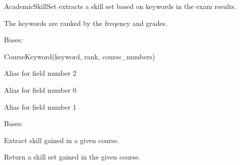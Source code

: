 \documentclass[letterpaper,10pt,english]{sphinxmanual}
\begin{document}
AcademicSkillSet extracts a skill set based on keywords in the exam results.

The keywords are ranked by the freqency and grades.

\begin{fulllineitems}
\label{cv_kickstarter:cv_kickstarter.academic_skill_set.CourseKeyword}
Bases: 

CourseKeyword(keyword, rank, course\_numbers)

\begin{fulllineitems}
\label{cv_kickstarter:cv_kickstarter.academic_skill_set.CourseKeyword.course_numbers}
Alias for field number 2

\end{fulllineitems}


\begin{fulllineitems}
\label{cv_kickstarter:cv_kickstarter.academic_skill_set.CourseKeyword.keyword}
Alias for field number 0

\end{fulllineitems}


\begin{fulllineitems}
\label{cv_kickstarter:cv_kickstarter.academic_skill_set.CourseKeyword.rank}
Alias for field number 1

\end{fulllineitems}


\end{fulllineitems}


\begin{fulllineitems}
\label{cv_kickstarter:cv_kickstarter.academic_skill_set.CourseSkillSet}
Bases: 

Extract skill gained in a given course.

\begin{fulllineitems}
\label{cv_kickstarter:cv_kickstarter.academic_skill_set.CourseSkillSet.skill_set}
Return a skill set gained in the given course.

\end{fulllineitems}


\end{fulllineitems}
\end{document}
